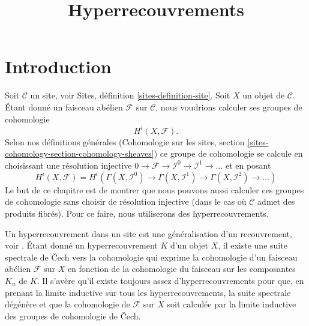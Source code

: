 

%


\title{Hyperrecouvrements}


\maketitle

\label{section-phantom}

\tableofcontents

\section{Introduction}
\label{section-introduction}

\noindent
Soit $\mathcal{C}$ un site, voir Sites, définition \ref{sites-definition-site}.
Soit $X$ un objet de $\mathcal{C}$.
Étant donné un faisceau abélien $\mathcal{F}$
sur $\mathcal{C}$, nous voudrions calculer
ses groupes de cohomologie
$$
H^i(X, \mathcal{F}).
$$
Selon nos définitions générales (Cohomologie sur les sites, section
\ref{sites-cohomology-section-cohomology-sheaves})
ce groupe de cohomologie se calcule en
choisissant une résolution injective
$
0 \to \mathcal{F} \to \mathcal{I}^0 \to \mathcal{I}^1 \to \ldots
$
et en posant
$$
H^i(X, \mathcal{F})
=
H^i(
\Gamma(X, \mathcal{I}^0) \to
\Gamma(X, \mathcal{I}^1) \to
\Gamma(X, \mathcal{I}^2)\to \ldots)
$$
Le but de ce chapitre est de montrer que nous pouvons aussi calculer ces
groupes de cohomologie sans choisir de résolution injective
(dans le cas où $\mathcal{C}$ admet des produits fibrés). Pour ce faire,
nous utiliserons des hyperrecouvrements.

\medskip\noindent
Un hyperrecouvrement dans un site est une généralisation d'un recouvrement, voir
\cite[Expos\'e V, Sec. 7]{SGA4}. Étant donné un hyperrecouvrement $K$ d'un objet
$X$, il existe une suite spectrale de {\v C}ech vers la cohomologie
qui exprime la cohomologie d'un faisceau abélien $\mathcal{F}$
sur $X$ en fonction de la cohomologie du faisceau sur les
composantes $K_n$ de $K$. Il s'avère qu'il existe toujours
assez d'hyperrecouvrements pour que, en prenant la limite inductive sur tous les hyperrecouvrements,
la suite spectrale dégénère et que la cohomologie de $\mathcal{F}$
sur $X$ soit calculée par la limite inductive des groupes de cohomologie de {\v C}ech.

